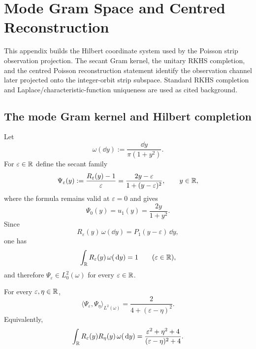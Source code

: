 
\section{Mode Gram Space and Centred Reconstruction}%
\label{sec:gram-space}

This appendix builds the Hilbert coordinate system used by the Poisson strip
observation projection.  The secant Gram kernel, the unitary RKHS completion,
and the centred Poisson reconstruction statement identify the observation
channel later projected onto the integer-orbit strip subspace.  Standard RKHS
completion and Laplace/characteristic-function uniqueness are used as cited
background.

\subsection{The mode Gram kernel and Hilbert completion}

Let
\[
\omega(\dd y):=\frac{\dd y}{\pi(1+y^2)}.
\]
For $\varepsilon\in\mathbb{R}$ define the secant family
\begin{equation}\label{eq:mode-secant-family}
\Psi_\varepsilon(y):=\frac{R_\varepsilon(y)-1}{\varepsilon}
=\frac{2y-\varepsilon}{1+(y-\varepsilon)^2},
\qquad y\in\mathbb{R},
\end{equation}
where the formula remains valid at $\varepsilon=0$ and gives
\[
\Psi_0(y)=u_1(y)=\frac{2y}{1+y^2}.
\]
Since
\[
R_\varepsilon(y)\,\omega(\dd y)=P_1(y-\varepsilon)\,\dd y,
\]
one has
\[
\int_{\mathbb{R}}R_\varepsilon(y)\,\omega(\,\mathrm{d} y)=1
\qquad(\varepsilon\in\mathbb{R}),
\]
and therefore $\Psi_\varepsilon\in L^2_0(\omega)$ for every
$\varepsilon\in\mathbb{R}$.

\begin{theorem}%
\label{thm:mode-gram-kernel}
For every $\varepsilon,\eta\in\mathbb{R}$,
\begin{equation}\label{eq:mode-gram-kernel}
\langle \Psi_\varepsilon,\Psi_\eta\rangle_{L^2(\omega)}
=\frac{2}{4+(\varepsilon-\eta)^2}.
\end{equation}
Equivalently,
\begin{equation}\label{eq:mode-gram-RR}
\int_{\mathbb{R}}R_\varepsilon(y)R_\eta(y)\,\omega(\,\mathrm{d} y)
=\frac{\varepsilon^2+\eta^2+4}{(\varepsilon-\eta)^2+4}.
\end{equation}
\end{theorem}

